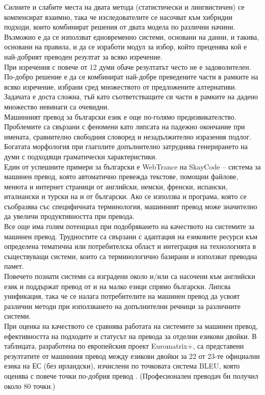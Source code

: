 \begin{multicols}{2}
  Силните и слабите места на двата метода (статистически и лингвистичен) се компенсират взаимно, така че изследователите се насочват към
   хибридни подходи, които комбинират решения от двата модела по различни начини. Възможно е да се използват едновременно системи, основани на данни, и
   такива, основани на правила, и да се изработи модул за избор, който преценява кой е най-добрият преводен резултат за всяко изречение. \\
  При изречения с повече от 12 думи обаче резултатът често не е задоволителен. По-добро решение е да се комбинират най-добре преведените части в рамките на всяко изречение, избрани сред множеството от предложените алтернативи. 
  Задачата е доста сложна, тъй като съответстващите си части в рамките на дадено множество невинаги са очевидни.\\
  Машинният превод за български език е още по-голямо предизвикателство. Проблемите са свързани с феномени като липсата на падежно окончание при имената, сравнително свободния словоред и незадължително изразения подлог. Богатата морфология при глаголите допълнително затруднява генерирането на думи с подходящи граматически характеристики.\\
  Един от успешните примери за български е WebTrance на SkayCode – система за машинен превод, която автоматично превежда текстове, помощни файлове, менюта и интернет страници от английски, немски, френски, испански, италиански и турски на и от български. Ако се използва и програма, която се съобразява със специфичната терминология, машинният превод може значително да увеличи продуктивността при превода.\\
 Все още има голям потенциал при подобряването на качеството на системите за машинен превод. Трудностите са свързани с адаптация на езиковите ресурси към определена тематична или потребителска област и интеграция на технологията в
   съществуващи системи, които са терминологично базирани и използват преводна памет. \\
  Повечето познати системи са изградени около и/или са насочени към английски език и поддържат превод от и на малко езици спрямо български. Липсва унификация, така че се налага потребителите на машинен превод да усвоят
   различни методи при използването на допълнителни речници за различните системи.\\
  При оценка на качеството се сравнява работата на системите за
   машинен превод, ефективността на подходите и статусът на превода за отделни
   езикови двойки. В таблицата, разработена по европейския проект
   Euromatrix+, са представени резултатите от машинния
   превод между езикови двойки за 22 от 23-те официални езика на ЕС
   (без ирландски), изчислени по точковата система BLEU, която оценява с повече точки по-добрия превод \cite{bleu1}. (Професионален преводач би получил около 80 точки.)


\end{multicols}

